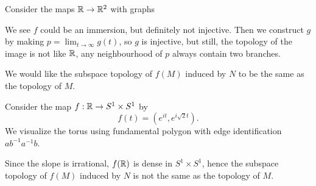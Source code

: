 \begin{example}
  Consider the maps \(\mathbb{R}\to\mathbb{R}^2\) with graphs \begin{center}
    \vspace{-14pt}
    \qquad
    \vspace{-20pt}
  \end{center}
  We see \(f\) could be an immersion, but definitely not injective. Then we construct \(g\) by making \(p = \lim_{t\to\infty} g(t)\), so \(g\) is injective, but still, the topology of the image is not like \(\mathbb{R}\), any neighbourhood of \(p\) always contain two branches. 

  We would like the subspace topology of \(f(M)\) induced by \(N\) to be the same as the topology of \(M\).
\end{example}

\begin{example}
  Consider the map \(f:\mathbb{R}\to S^1\times S^1\) by \[
    f(t) = (e^{it},e^{i\sqrt{2}t}).
  \]
  We visualize the torus using fundamental polygon with edge identification \(ab^{-1}a^{-1}b\).
  \begin{center}
    
  \end{center}
  Since the slope is irrational, \(f(\mathbb{R})\) is dense in \(S^1\times S^1\), hence the subspace topology of \(f(M)\) induced by \(N\) is not the same as the topology of \(M\).
\end{example}

